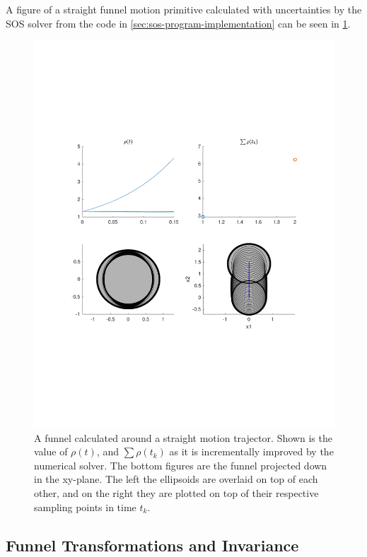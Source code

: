 A figure of a straight funnel motion primitive calculated with uncertainties by
the \ac{SOS} solver from the code in \cref{sec:sos-program-implementation} can
be seen in \cref{fig:funnel-calculation-visuals}.

\begin{figure}
  \centering \includegraphics[scale=.5, trim={0cm 6cm 0cm
    6cm}]{figures/method/funnel-calculation-visuals}
  \caption[A funnel calculated around a straight trajector]{A funnel calculated
    around a straight motion trajector. Shown is the value of \(\rho(t)\), and
    \(\sum \rho(t_k)\) as it is incrementally improved by the numerical solver.
    The bottom figures are the funnel projected down in the xy-plane. The left
    the ellipsoids are overlaid on top of each other, and on the right they are
    plotted on top of their respective sampling points in time \(t_k\).}
  \label{fig:funnel-calculation-visuals}
\end{figure}

\subsection{Funnel Transformations and Invariance}
\label{subsec:shifting-funnels}

